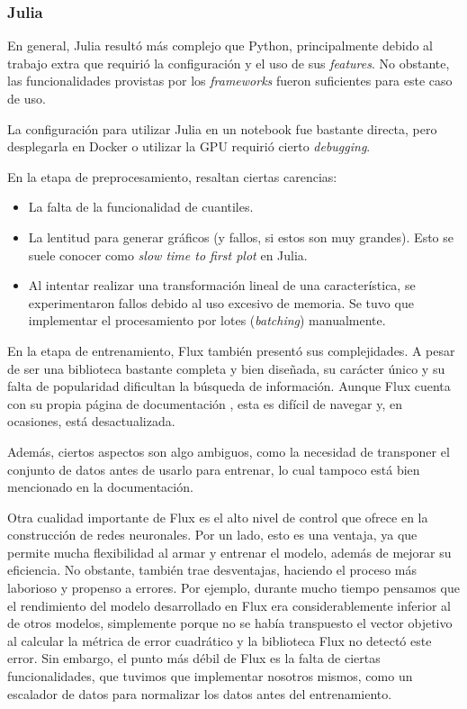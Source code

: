 \documentclass[11pt]{article}
\let\Oldsubsubsection\subsubsection
\renewcommand{\subsubsection}{\FloatBarrier\Oldsubsubsection}
\newcommand{\english}[1]{\textit{#1}}
\begin{document}
\subsubsection{Julia}

En general, Julia resultó más complejo que Python, principalmente debido al trabajo extra que requirió la configuración y el uso de sus \english{features}. No obstante, las funcionalidades provistas por los \english{frameworks} fueron suficientes para este caso de uso.

La configuración para utilizar Julia en un notebook fue bastante directa, pero desplegarla en Docker o utilizar la GPU requirió cierto \english{debugging}.

En la etapa de preprocesamiento, resaltan ciertas carencias:

\begin{itemize}
    \item La falta de la funcionalidad de cuantiles.
    \item La lentitud para generar gráficos (y fallos, si estos son muy grandes). Esto se suele conocer como \english{slow time to first plot} \cite{jl:ex:slow_time_first_plot} en Julia.
    \item Al intentar realizar una transformación lineal de una característica, se experimentaron fallos debido al uso excesivo de memoria. Se tuvo que implementar el procesamiento por lotes (\english{batching}) manualmente.
\end{itemize}

    En la etapa de entrenamiento, Flux también presentó sus complejidades. A pesar de ser una biblioteca bastante completa y bien diseñada, su carácter único y su falta de popularidad dificultan la búsqueda de información. Aunque Flux cuenta con su propia página de documentación \cite{jl:lib:flux}, esta es difícil de navegar y, en ocasiones, está desactualizada. %

Además, ciertos aspectos son algo ambiguos, como la necesidad de transponer el conjunto de datos antes de usarlo para entrenar, lo cual tampoco está bien mencionado en la documentación.

Otra cualidad importante de Flux es el alto nivel de control que ofrece en la construcción de redes neuronales. Por un lado, esto es una ventaja, ya que permite mucha flexibilidad al armar y entrenar el modelo, además de mejorar su eficiencia. No obstante, también trae desventajas, haciendo el proceso más laborioso y propenso a errores. Por ejemplo, durante mucho tiempo pensamos que el rendimiento del modelo desarrollado en Flux era considerablemente inferior al de otros modelos, simplemente porque no se había transpuesto el vector objetivo al calcular la métrica de error cuadrático y la biblioteca Flux no detectó este error. Sin embargo, el punto más débil de Flux es la falta de ciertas funcionalidades, que tuvimos que implementar nosotros mismos, como un escalador de datos para normalizar los datos antes del entrenamiento.
\end{document}
